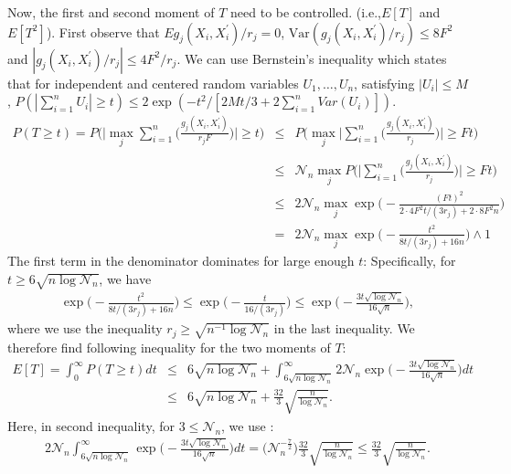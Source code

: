 \documentclass{article}
\theoremstyle{definition}
\begin{document}
Now, the first and second moment of $T$ need to be controlled. (i.e.,$E[T]$ and $E[T^{2}]$). 
First observe that $E g_{j}(X_i,X_i^{'})/r_{j}=0$, $\text{Var}(g_{j}(X_i,X_i^{'})/r_{j})\leq 8F^{2}$ and $|g_{j}(X_i,X_i^{'})/r_{j}|\leq 4F^{2}/r_{j}$.
We can use Bernstein's inequality which states that for independent and centered random variables $U_{1},\dots,U_{n}$, satisfying $|U_{i}|\leq M$, $P(|\sum_{i=1}^{n}U_{i}|\geq t)\leq 2\exp(-t^{2}/[2Mt/3+2\sum_{i=1}^{n}Var(U_{i})])$.
\begin{eqnarray*}
    P(T\geq t) = 
    P\bigg( \bigg| \max_{j} \sum_{i=1}^{n} \bigg( \frac{g_{j}(X_i,X_i^{'})}{r_{j}F} \bigg) \bigg| \geq t \bigg)
    &\leq& P\bigg( \max_{j} \bigg| \sum_{i=1}^{n} \bigg( \frac{g_{j}(X_i,X_i^{'})}{r_{j}} \bigg) \bigg| \geq Ft \bigg)\\
    &\leq& \mathcal{N}_n \max_{j} P\bigg( \bigg| \sum_{i=1}^{n} \bigg( \frac{g_{j}(X_i,X_i^{'})}{r_{j}} \bigg) \bigg| \geq Ft \bigg) \\
    &\leq& 2\mathcal{N}_n \max_{j} \exp\bigg( -\frac{(Ft)^{2}}{2\cdot 4F^{2}t/(3r_j)+2\cdot8F^{2}n } \bigg) \\ 
    &=& 2\mathcal{N}_n \max_{j} \exp\bigg( -\frac{t^{2}}{8t/(3r_j)+16n } \bigg) \wedge 1 
\end{eqnarray*}
The first term in the denominator dominates for large enough $t$: Specifically, for $t\geq 6\sqrt{n\log\mathcal{N}_{n}}$, we have
\begin{eqnarray*}
    \exp\bigg( -\frac{t^{2}}{8t/(3r_j)+16n} \bigg) \leq \exp\bigg( -\frac{t}{16/(3r_j)} \bigg) \leq \exp\bigg( -\frac{3t\sqrt{\log\mathcal{N}_{n}}}{16\sqrt{n}} \bigg),
\end{eqnarray*}
where we use the inequality $r_j\geq \sqrt{n^{-1}\log\mathcal{N}_{n}}$ in the last inequality. We therefore find following inequality for the two moments of $T$:
\begin{eqnarray*}
    E[T] = \int_{0}^{\infty}P(T \geq t) dt 
    &\leq& 6\sqrt{n\log\mathcal{N}_{n}} + \int_{6\sqrt{n\log\mathcal{N}_{n}}}^{\infty}2\mathcal{N}_n \exp\bigg( -\frac{3t\sqrt{\log\mathcal{N}_{n}}}{16\sqrt{n}} \bigg) dt\\
    &\leq& 6\sqrt{n\log\mathcal{N}_{n}} + \frac{32}{3}\sqrt{\frac{n}{\log\mathcal{N}_{n}}}.
\end{eqnarray*}
Here, in second inequality, for $3\leq \mathcal{N}_{n}$, we use : 
\begin{eqnarray*}
    2\mathcal{N}_n \int_{6\sqrt{n\log\mathcal{N}_{n}}}^{\infty}\exp\bigg( -\frac{3t\sqrt{\log\mathcal{N}_{n}}}{16\sqrt{n}} \bigg) dt
    =\bigg(\mathcal{N}_n^{-\frac{7}{2}}\bigg)\frac{32}{3}\sqrt{\frac{n}{\log\mathcal{N}_{n}}}
    \leq \frac{32}{3}\sqrt{\frac{n}{\log\mathcal{N}_{n}}}.
\end{eqnarray*}
\end{document}
